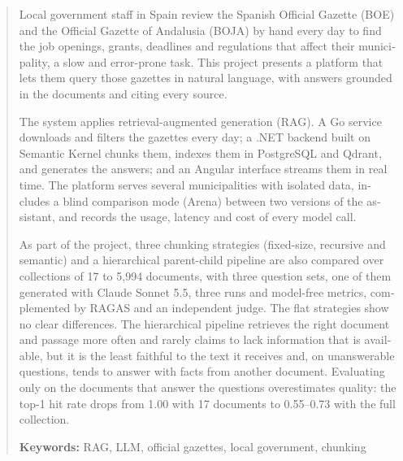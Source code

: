 \renewcommand{\abstractname}{Abstract}
\begin{abstract}
\begin{otherlanguage}{english}
Local government staff in Spain review the Spanish Official Gazette (BOE) and the Official Gazette of Andalusia (BOJA) by hand every day to find the job openings, grants, deadlines and regulations that affect their municipality, a slow and error-prone task. This project presents a platform that lets them query those gazettes in natural language, with answers grounded in the documents and citing every source.

The system applies retrieval-augmented generation (RAG). A Go service downloads and filters the gazettes every day; a .NET backend built on Semantic Kernel chunks them, indexes them in PostgreSQL and Qdrant, and generates the answers; and an Angular interface streams them in real time. The platform serves several municipalities with isolated data, includes a blind comparison mode (Arena) between two versions of the assistant, and records the usage, latency and cost of every model call.

As part of the project, three chunking strategies (fixed-size, recursive and semantic) and a hierarchical parent-child pipeline are also compared over collections of 17 to 5,994 documents, with three question sets, one of them generated with Claude Sonnet 5.5, three runs and model-free metrics, complemented by RAGAS and an independent judge. The flat strategies show no clear differences. The hierarchical pipeline retrieves the right document and passage more often and rarely claims to lack information that is available, but it is the least faithful to the text it receives and, on unanswerable questions, tends to answer with facts from another document. Evaluating only on the documents that answer the questions overestimates quality: the top-1 hit rate drops from 1.00 with 17 documents to 0.55--0.73 with the full collection.

\medskip
\noindent\textbf{Keywords:} RAG, LLM, official gazettes, local government, chunking
\end{otherlanguage}
\end{abstract}
